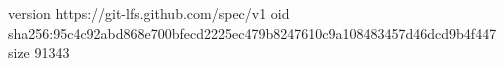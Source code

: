 version https://git-lfs.github.com/spec/v1
oid sha256:95c4c92abd868e700bfecd2225ec479b8247610c9a108483457d46dcd9b4f447
size 91343
